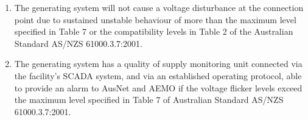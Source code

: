\begin{enumerate}[label=(\alph*)]
	\item The generating system will not cause a voltage disturbance at the connection point due to sustained unstable behaviour of more than the maximum level specified in Table 7 or the compatibility levels in Table 2 of the Australian Standard AS/NZS 61000.3.7:2001.
	\item The generating system has a quality of supply monitoring unit connected via the facility’s SCADA system, and via an established operating protocol, able to provide an alarm to AusNet and AEMO if the voltage flicker levels exceed the maximum level specified in Table 7 of Australian Standard AS/NZS 61000.3.7:2001.
\end{enumerate}

